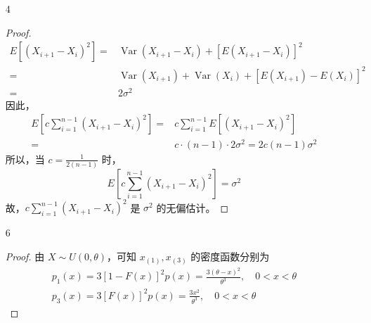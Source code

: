 \documentclass[normal,founder,mtpro2,cn]{elegantnote}
\begin{document}
\begin{enumerate}
\begin{proof}
        \end{proof}
    \item[4]
        \begin{proof}
            \begin{equation*}
                \begin{aligned}
                    E\left[\left(X_{i+1}-X_{i}\right)^{2}\right]= & \operatorname{Var}\left(X_{i+1}-X_{i}\right)+\left[E\left(X_{i+1}-X_{i}\right)\right]^{2}                                              \\
                    =                                             & \operatorname{Var}\left(X_{i+1}\right)+\operatorname{Var}\left(X_{i}\right)+\left[E\left(X_{i+1}\right)-E\left(X_{i}\right)\right]^{2} \\
                    =                                             & 2\sigma^{2}
                \end{aligned}
            \end{equation*}
            因此，
            \begin{equation*}
                \begin{aligned}
                    E\left[c\sum_{i=1}^{n-1}\left(X_{i+1}-X_{i}\right)^{2}\right]= & c\sum_{i=1}^{n-1}E\left[\left(X_{i+1}-X_{i}\right)^{2}\right] \\
                    =                                                              & c\cdot(n-1)\cdot 2\sigma^{2}=2c(n-1)\sigma^{2}
                \end{aligned}
            \end{equation*}
            所以，当 $c=\frac{1}{2(n-1)}$ 时，
            \begin{equation*}
                E\left[c\sum_{i=1}^{n-1}\left(X_{i+1}-X_{i}\right)^{2}\right]=\sigma^{2}
            \end{equation*}
            故，$c\sum_{i=1}^{n-1}\left(X_{i+1}-X_{i}\right)^{2}$ 是 $\sigma^{2}$ 的无偏估计。
        \end{proof}
    \item[6]
        \begin{proof}
            由 $X\sim U(0,\theta)$，可知 $x_{(1)},x_{(3)}$ 的密度函数分别为
            \begin{gather*}
                p_{1}(x)=3[1-F(x)]^{2}p(x)=\frac{3(\theta-x)^{2}}{\theta^{3}},\quad 0<x<\theta \\
                p_{3}(x)=3[F(x)]^{2}p(x)=\frac{3x^{2}}{\theta^{3}},\quad 0<x<\theta
            \end{gather*}

\end{proof}
\end{enumerate}
\end{document}
